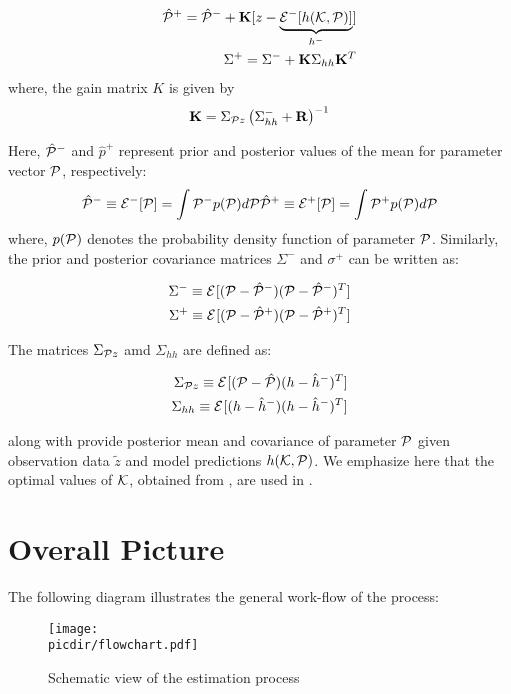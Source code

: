 \documentclass{article}         %
\theoremstyle{definition}
\theoremstyle{remark}
\newcommand{\picdir}{pdffig/}
\begin{document}
\begin{eqnarray}
\hat{\p}^+=\hat{\p}^-+\K[z-\underbrace{\Ex{h(\kk,\p)}{-}}_{h^-}]\label{minvarmean}\\
\Sigma^+=\Sigma^-+\K\Sigma_{hh}\K^T\label{minvarvar}
\end{eqnarray}
where, %
the gain matrix $K$ is given by
\begin{eqnarray}\label{kgain}
\K=\Sigma_{\p z}\left(\Sigma_{hh}^-+\R\right)^{-1}
\end{eqnarray}

Here, $\hat{\p}^-$ and $\hat{p}^+$ represent prior and posterior values of the mean for parameter vector $\p$, respectively:
\begin{eqnarray}
\hat{\p}^-\equiv \Ex{\p}{-}=\int \p^- p(\p)d\p \label{Pprior}
\hat{\p}^+\equiv \Ex{\p}{+}=\int \p^+ p(\p)d\p \label{Pposterior}
\end{eqnarray}
where, $p(\p)$ denotes the probability density function of parameter $\p$. Similarly, the prior and posterior covariance matrices $\Sigma^{-}$ and $\sigma^+$ can be written as:

\begin{eqnarray}
\Sigma^-\equiv\Ex{(\p-\hat{\p}^-)(\p-\hat{\p}^-)^T}{}\\
\Sigma^+\equiv\Ex{(\p-\hat{\p}^+)(\p-\hat{\p}^+)^T}{}
\end{eqnarray}

The matrices $\Sigma_{\p z}$ amd $\Sigma_{hh}$ are defined as:

\begin{eqnarray}
\Sigma_{\p z} \equiv\Ex{(\p-\hat{\p})(h-\hat{h}^-)^T}{}\\
\Sigma_{hh} \equiv\Ex{(h-\hat{h}^-)(h-\hat{h}^-)^T}{}
\end{eqnarray}

 along with  provide posterior mean and covariance of parameter $\p$ given observation data $\tilde{z}$ and model predictions $h(\kk,\p)$.
We emphasize here that the optimal values of $\kk$, obtained from , are used in .

\section*{Overall Picture}
The following diagram illustrates the general work-flow of the process:
\begin{figure}[h!!]
\center
\texttt{[image: \\picdir/flowchart.pdf]}
\caption{Schematic view of the estimation process}
\end{figure}
\end{document}
